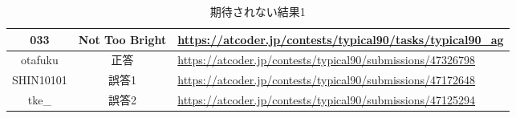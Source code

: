 \begin{table}[h]
    \centering
    \caption{期待されない結果1}
    \label{tab:33}
    \begin{adjustbox}{center}
    \begin{tabular}{|c|c|p{10cm}|}%
        \hline
        033 & Not Too Bright & \url{https://atcoder.jp/contests/typical90/tasks/typical90_ag} \\ \hline
        otafuku & 正答
        & \url{https://atcoder.jp/contests/typical90/submissions/47326798} \\ \hline
        SHIN10101 & 誤答1
        
        & \url{https://atcoder.jp/contests/typical90/submissions/47172648} \\ \hline
        tke\_ & 誤答2
        
        & \url{https://atcoder.jp/contests/typical90/submissions/47125294} \\ \hline
    \end{tabular}
    \end{adjustbox}
\end{table}




